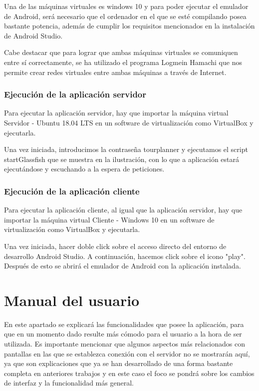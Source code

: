 Una de las máquinas virtuales es windows 10 y para poder ejecutar el emulador de Android, será necesario que el ordenador en el que se esté compilando posea bastante potencia, además de cumplir los requisitos mencionados en la instalación de Android Studio.

Cabe destacar que para lograr que ambas máquinas virtuales se comuniquen entre sí correctamente, se ha utilizado el programa Logmein Hamachi que nos permite crear redes virtuales entre ambas máquinas a través de Internet.

\subsubsection{Ejecución de la aplicación servidor}

Para ejecutar la aplicación servidor, hay que importar la máquina virtual Servidor - Ubuntu 18.04 LTS en un software de virtualización como VirtualBox y ejecutarla.

Una vez iniciada, introducimos la contraseña tourplanner y ejecutamos el script startGlassfish que se muestra en la ilustración, con lo que a aplicación estará ejecutándose y escuchando a la espera de peticiones.



\subsubsection{Ejecución de la aplicación cliente}

Para ejecutar la aplicación cliente, al igual que la aplicación servidor, hay que importar la máquina virtual Cliente - Windows 10 en un software de virtualización como VirtualBox y ejecutarla.

Una vez iniciada, hacer doble click sobre el acceso directo del entorno de desarrollo Android Studio. A continuación, hacemos click sobre el icono "play". Después de esto se abrirá el emulador de Android con la aplicación instalada.

\section{Manual del usuario}

En este apartado se explicará las funcionalidades que posee la aplicación, para que en un momento dado resulte más cómodo para el usuario a la hora de ser utilizada. Es importante mencionar que algunos aspectos más relacionados con pantallas en las que se establezca conexión con el servidor no se mostrarán aquí, ya que son explicaciones que ya se han desarrollado de una forma bastante completa en anteriores trabajos \cite{tfm1} y en este caso el foco se pondrá sobre los cambios de interfaz y la funcionalidad más general.

